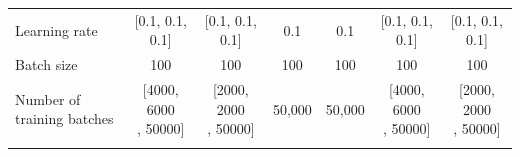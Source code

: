 \begin{table}
\begin{tabular}{l c c c c c c}
Learning rate & [0.1, 0.1, 0.1] & [0.1, 0.1, 0.1] & 0.1 & 0.1  & [0.1, 0.1, 0.1] & [0.1, 0.1, 0.1]\\
Batch size & 100 & 100 & 100 & 100 & 100 & 100\\
Number of training batches & \makecell{[4000, 6000\\, 50000]} & \makecell{[2000, 2000\\, 50000]} & 50,000 & 50,000 & \makecell{[4000, 6000\\, 50000]} & \makecell{[2000, 2000\\, 50000]}\\
\bottomrule\\
\end{tabular}
\end{table}
